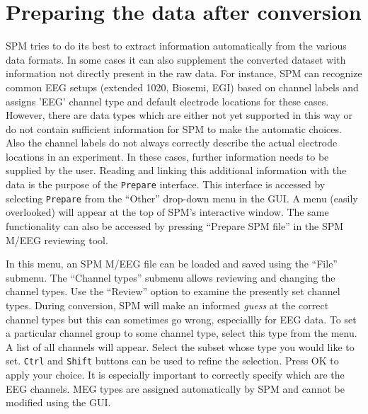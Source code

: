 \section{Preparing the data after conversion}
SPM tries to do its best to extract information automatically from the various data formats. In some cases it can also supplement the converted dataset with information not directly present in the raw data. For instance, SPM can recognize common EEG setups (extended 1020, Biosemi, EGI) based on channel labels and assigns 'EEG' channel type and default electrode locations for these cases. However, there are data types which are either not yet supported in this way or do not contain sufficient information for SPM to make the automatic choices. Also the channel labels do not always correctly describe the actual electrode locations in an experiment. In these cases, further information needs to be supplied by the user. Reading and linking this additional information with the data is the purpose of the \texttt{Prepare} interface. This interface is accessed by selecting \texttt{Prepare} from the ``Other'' drop-down menu in the GUI. A menu (easily overlooked) will appear at the top of SPM's interactive window. The same functionality can also be accessed by pressing ``Prepare SPM file'' in the SPM M/EEG reviewing tool.

In this menu, an SPM M/EEG file can be loaded and saved using the ``File'' submenu. The ``Channel types'' submenu allows reviewing and changing the channel types. Use the ``Review'' option to examine the presently set channel types. During conversion, SPM  will make an informed \textit{guess} at the correct channel types but this can sometimes go wrong, especiallly for EEG data. To set a particular channel group to some channel type, select this type from the menu. A list of all channels will appear. Select the subset whose type you would like to set. \texttt{Ctrl} and \texttt{Shift} buttons can be used to refine the selection. Press OK to apply your choice. It is especially important to correctly specify which are the EEG channels. MEG types are assigned automatically by SPM and cannot be modified using the GUI.

